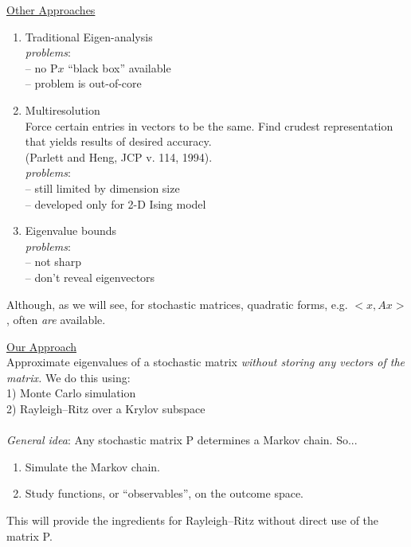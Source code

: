 \documentclass{slides}
\newcommand{\Prob}{\mbox{P}}
\begin{document}
\begin{slide}
\underline{Other Approaches}
\begin{enumerate}
\item Traditional Eigen-analysis \\
{\it problems}: \\
-- no $\Prob x$ ``black box'' available\\
-- problem is out-of-core
\item Multiresolution\\
Force certain entries in vectors to be the same.
Find crudest representation that yields results 
of desired accuracy. \\
(Parlett and Heng, JCP v. 114, 1994).\\
{\it problems}: \\
-- still limited by dimension size \\
-- developed only for 2-D Ising model
\item Eigenvalue bounds \\
{\it problems}: \\
-- not sharp\\
-- don't reveal eigenvectors
\end{enumerate}
\end{slide}

\begin{note}
Although, as we will see, 
for stochastic matrices, quadratic forms, 
e.g. $<x,A x>$, often \emph{are} available.
\end{note}

\begin{slide}
\underline{Our Approach}\\
Approximate eigenvalues of a stochastic matrix
\emph{without storing any vectors of the matrix.}
We do this using:\\
1) Monte Carlo simulation  \\
2) Rayleigh--Ritz over a Krylov subspace\\\\
{\it General idea}:
Any stochastic matrix P determines a Markov chain.  So...
\begin{enumerate}
\item Simulate the Markov chain.
\item Study functions, or ``observables'', on the outcome space.
\end{enumerate}
This will provide the ingredients for 
Rayleigh--Ritz without direct use of the matrix P.
\end{slide}
\end{document}
